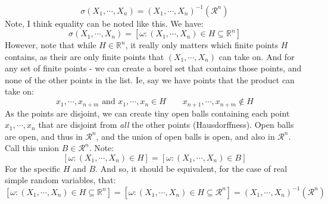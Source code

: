 \documentclass[12pt,a4paper]{article}
\newcommand{\1}[1]{\mathbbm{1}\left\{ #1 \right\}}
\newcommand{\R}{\mathbb{R}}
\newcommand{\rcal}{\mathcal{R}}
\begin{document}
\begin{enumerate}
	$$
		\sigma(X_1, \cdots, X_n) = (X_1, \cdots, X_n)^{-1}(\rcal^n)
	$$
	Note, I think equality can be noted like this. We have:
	$$
		\sigma(X_1, \cdots, X_n) = \left[\omega : (X_1, \cdots, X_n) \in H \subseteq \R^n\right]
	$$
	However, note that while $H \in \R^n$, it really only matters which finite points $H$ contains, as their are only finite points that $(X_1, \cdots, X_n)$ can take on. And for any set of finite points - we can create a borel set that contains those points, and none of the other points in the list. Ie, say we have points that the product can take on:
	$$
		x_1, \cdots, x_{n + m} \text{ and } x_1, \cdots, x_n \in H \quad\quad x_{n+1}, \cdots, x_{n + m} \not\in H
	$$
	As the points are disjoint, we can create tiny open balls containing each point $x_1, \cdots, x_n$ that are disjoint from \textit{all} the other points (Hausdorffness). Open balls are open, and thus in $\rcal^n$, and the union of open balls is open, and also in $\rcal^n$. Call this union $B \in \rcal^n$. Note:
	$$
		\left[\omega : (X_1, \cdots, X_n) \in H\right] =
		\left[\omega : (X_1, \cdots, X_n) \in B\right]
	$$
	For the specific $H$ and $B$. And so, it should be equivalent, for the case of real simple random variables, that:
	$$
		\left[\omega : (X_1, \cdots, X_n) \in H \subseteq \R^n\right] =
		\left[\omega : (X_1, \cdots, X_n) \in H \subseteq \rcal^n\right] =
		(X_1, \cdots, X_n)^{-1}(\rcal^n)
	$$
	

\end{enumerate}
\end{document}
